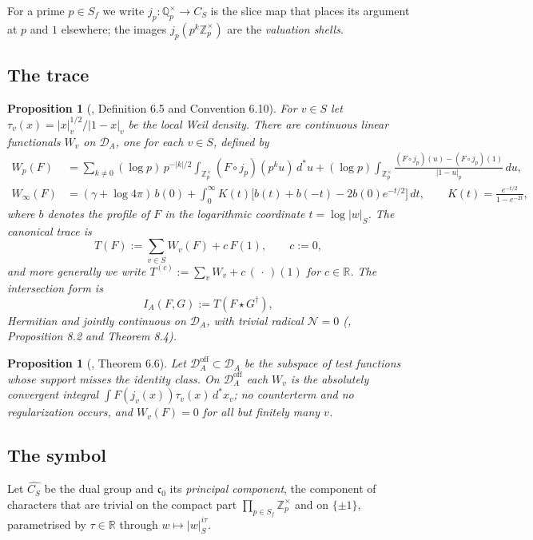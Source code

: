\documentclass[11pt]{amsart}
\newtheorem{proposition}[theorem]{Proposition}
\theoremstyle{definition}
\theoremstyle{remark}
\newcommand{\R}{\mathbb R}
\newcommand{\Z}{\mathbb Z}
\newcommand{\Q}{\mathbb Q}
\newcommand{\DA}{\mathcal D_A}
\newcommand{\CS}{C_S}
\newcommand{\cz}{\mathfrak c_0}
\begin{document}
For a prime $p\in S_f$ we write $j_p\colon\Q_p^\times\to\CS$ is the slice map that
places its argument at $p$ and $1$ elsewhere; the images
$j_p(p^k\Z_p^\times)$ are the \emph{valuation shells}.

\subsection{The trace}

\begin{proposition}[\cite{P43}, Definition 6.5 and Convention 6.10]
\label{prop:trace}
For $v\in S$ let $\tau_v(x)=|x|_v^{1/2}/|1-x|_v$ be the local Weil density.
There are continuous linear functionals $W_v$ on $\DA$, one for each $v\in S$,
defined by
\begin{align*}
  W_p(F)&=\sum_{k\ne0}(\log p)\,p^{-|k|/2}\!\!\int_{\Z_p^\times}\!\!
      (F\circ j_p)(p^ku)\,d^*u
     +(\log p)\!\int_{\Z_p^\times}\!\frac{(F\circ j_p)(u)-(F\circ j_p)(1)}{|1-u|_p}\,du,\\
  W_\infty(F)&=(\gamma+\log4\pi)\,b(0)
     +\int_0^\infty K(t)\bigl[b(t)+b(-t)-2b(0)e^{-t/2}\bigr]\,dt,
  \qquad K(t)=\frac{e^{-t/2}}{1-e^{-2t}},
\end{align*}
where $b$ denotes the profile of $F$ in the logarithmic coordinate
$t=\log|w|_S$.  The \emph{canonical trace} is
\[
  T(F):=\sum_{v\in S}W_v(F)+c\,F(1),\qquad c:=0 ,
  \tag{2.3}
\]
and more generally we write $T^{(c)}:=\sum_v W_v+c\,(\,\cdot\,)(1)$ for
$c\in\R$.  The \emph{intersection form} is
\[
  I_A(F,G):=T(F\star G^\dagger),
  \tag{2.4}
\]
Hermitian and jointly continuous on $\DA$, with trivial radical
$\mathcal N=0$ \emph{(\cite{P43}, Proposition 8.2 and Theorem 8.4)}.
\end{proposition}

\begin{proposition}[\cite{P43}, Theorem 6.6]
\label{prop:offidentity}
Let $\DA^{\mathrm{off}}\subset\DA$ be the subspace of test functions whose
support misses the identity class.  On $\DA^{\mathrm{off}}$ each $W_v$ is the
absolutely convergent integral $\int F(j_v(x))\tau_v(x)\,d^*x_v$; no
counterterm and no regularization occurs, and $W_v(F)=0$ for all but finitely
many $v$.
\end{proposition}

\subsection{The symbol}

Let $\widehat{\CS}$ be the dual group and $\cz$ its \emph{principal component},
the component of characters that are trivial on the compact part
$\prod_{p\in S_f}\Z_p^\times$ and on $\{\pm1\}$, parametrised by
$\tau\in\R$ through $w\mapsto|w|_S^{i\tau}$.
\end{document}
